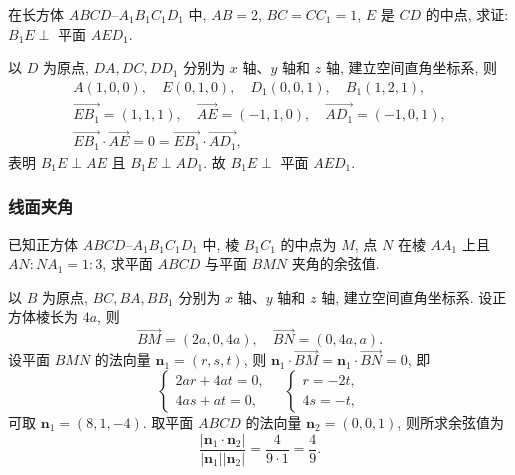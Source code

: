 
\lianxi
\begin{exercise}[s]
    在长方体 $ABCD\text{--}A_1B_1C_1D_1$ 中, $AB=2$, $BC=CC_1= 1$, $E$ 是 $CD$ 的中点, 求证: $B_1E\perp$ 平面 $AED_1$.
\end{exercise}
\beginsolution
    以 $D$ 为原点, $DA, DC, DD_1$ 分别为 $x$ 轴、$y$ 轴和 $z$ 轴, 建立空间直角坐标系, 则
    \[\begin{gathered}
        A(1,0,0),\quad E(0,1,0),\quad D_1(0,0,1),\quad B_1(1,2,1),\\
        \overrightarrow{EB_1}= (1,1,1),\quad
        \overrightarrow{AE}= (-1,1,0),\quad
        \overrightarrow{AD_1}= (-1,0,1),\\
        \overrightarrow{EB_1}\cdot \overrightarrow{AE}= 0
        = \overrightarrow{EB_1}\cdot \overrightarrow{AD_1},
    \end{gathered}\]
    表明 $B_1E\perp AE$ 且 $B_1E\perp AD_1$. 故 $B_1E\perp$ 平面 $AED_1$.
\endsolution

\subsubsection{线面夹角}
\begin{example}
    已知正方体 $ABCD\text{--}A_1B_1C_1D_1$ 中, 棱 $B_1C_1$ 的中点为 $M$, 点 $N$ 在棱 $AA_1$ 上且 $AN: NA_1= 1:3$, 求平面 $ABCD$ 与平面 $BMN$ 夹角的余弦值.
\end{example}
\beginsolution
    以 $B$ 为原点, $BC, BA, BB_1$ 分别为 $x$ 轴、$y$ 轴和 $z$ 轴, 建立空间直角坐标系. 设正方体棱长为 $4a$, 则
    \[\overrightarrow{BM}= (2a,0,4a),\quad
    \overrightarrow{BN}= (0,4a,a).\]
    设平面 $BMN$ 的法向量 $\bm{n}_1= (r,s,t)$, 则 $\bm{n}_1\cdot \overrightarrow{BM}= \bm{n}_1\cdot \overrightarrow{BN}= 0$, 即
    \[\left\{\!\!\begin{array}{l}
        2ar+ 4at= 0,\\
        4as+ at= 0,
    \end{array}\right.\quad
    \left\{\!\!\begin{array}{l}
        r= -2t,\\
        4s= -t,
    \end{array}\right.\]
    可取 $\bm{n}_1= (8,1,-4)$. 取平面 $ABCD$ 的法向量 $\bm{n}_2= (0,0,1)$, 则所求余弦值为
    \[\frac{|\bm{n}_1\cdot \bm{n}_2|}{|\bm{n}_1| |\bm{n}_2|}
    = \frac4{9\cdot 1}= \frac49.\]
\endsolution
    
